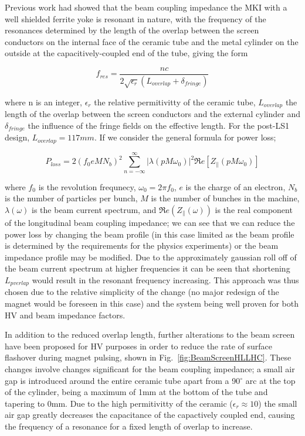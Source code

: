 \documentclass[a4paper,
              ]{jacow}
\begin{document}
Previous work had showed that the beam coupling impedance the MKI with a well shielded ferrite yoke is resonant in nature, with the frequency of the resonances determined by the length of the overlap between the screen conductors on the internal face of the ceramic tube and the metal cylinder on the outside at the capacitively-coupled end of the tube, giving the form

\begin{equation}
f_{res} = \frac{nc}{2\sqrt{\epsilon_{r}}\left( L_{overlap}+ \delta_{fringe} \right)}
\end{equation}

where n is an integer, $\epsilon_{r}$ the relative permitivitty of the ceramic tube, $L_{overlap}$ the length of the overlap between the screen conductors and the external cylinder and $\delta_{fringe}$ the influence of the fringe fields on the effective length. For the post-LS1 design, $L_{overlap} = 117mm$. If we consider the general formula for power loss;

\begin{equation}
P_{loss} = 2 \left( f_{0} e M  N_{b}\right)^{2} \displaystyle\sum\limits_{n = -\infty}^{\infty}  \left| \lambda \left( p M \omega_{0} \right)  \right|^{2} \Re{}e \left[ Z_{\parallel} \left( p M \omega_{0} \right) \right]
\label{eqn:powLoss}
\end{equation}

where $f_{0}$ is the revolution frequnecy, $\omega_{0} = 2\pi f_{0}$, $e$ is the charge of an electron, $N_{b}$ is the number of particles per bunch, $M$ is the number of bunches in the machine, $\lambda (\omega)$ is the beam current spectrum, and $\Re{}e(Z_{\parallel}(\omega))$ is the real component of the longitudinal beam coupling impedance; we can see that we can reduce the power loss by changing the beam profile (in this case limited as the beam profile is determined by the requirements for the physics experiments) or the beam impedance profile may be modified. Due to the approximately gaussian roll off of the beam current spectrum at higher frequencies it can be seen that shortening $L_{pverlap}$ would result in the resonant frequency increasing. This approach was thus chosen due to the relative simplicity of the change (no major redesign of the magnet would be foreseen in this case) and the system being well proven for both HV and beam impedance factors.

In addition to the reduced overlap length, further alterations to the beam screen have been proposed for HV purposes in order to reduce the rate of surface flashover during magnet pulsing, shown in Fig.~\ref{fig:BeamScreenHLLHC}. These changes involve changes significant for the beam coupling impedance; a small air gap is introduced around the entire ceramic tube apart from a 90$^{\circ}$ arc at the top of the cylinder, being a maximum of 1mm at the bottom of the tube and tapering to 0mm. Due to the high permitivitty of the ceramic ($\epsilon_{r}\approx 10$) the small air gap greatly decreases the capacitance of the capactively coupled end, causing the frequency of a resonance for a fixed length of overlap to increase. 
\end{document}
